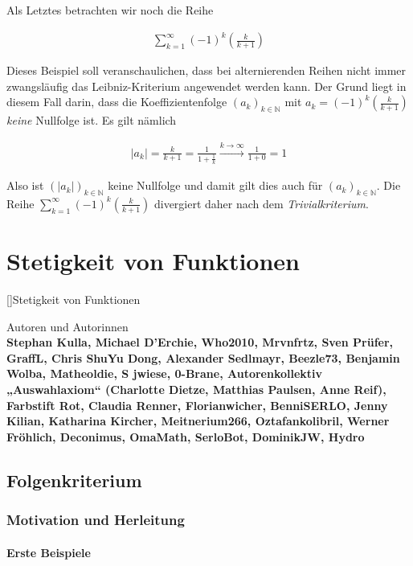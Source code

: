 \documentclass[fontsize=9pt,
               parskip=half-,
               DIV=14,
               listof=chapterentry,
               tocflat]{scrbook}
\newenvironment{authors}{\par\vspace*{\fill}\color{white}Autoren und
Autorinnen\\\bfseries}{\clearpage}
\begin{document}
Als Letztes betrachten wir noch die Reihe

\begin{align*}
\sum _{k=1}^{\infty }(-1)^{k}\left({\frac {k}{k+1}}\right)
\end{align*}

Dieses Beispiel soll veranschaulichen, dass bei alternierenden Reihen nicht immer zwangsläufig das Leibniz-Kriterium angewendet werden kann. Der Grund liegt in diesem Fall darin, dass die Koeffizientenfolge $(a_{k})_{k\in \mathbb {N} }$ mit $a_{k}=(-1)^{k}\left({\tfrac {k}{k+1}}\right)$ \emph{keine} Nullfolge ist. Es gilt nämlich

\begin{align*}
|a_{k}|={\frac {k}{k+1}}={\frac {1}{1+{\frac {1}{k}}}}{\overset {k\to \infty }{\to }}{\frac {1}{1+0}}=1
\end{align*}

Also ist $(|a_{k}|)_{k\in \mathbb {N} }$ keine Nullfolge und damit gilt dies auch für $(a_{k})_{k\in \mathbb {N} }$. Die Reihe $\sum _{k=1}^{\infty }(-1)^{k}\left({\tfrac {k}{k+1}}\right)$ divergiert daher nach dem \emph{Trivialkriterium}.

\part{Stetigkeit von Funktionen}

[]{Stetigkeit von Funktionen}\begin{authors}
Stephan Kulla, Michael D'Erchie, Who2010, Mrvnfrtz, Sven Prüfer, GraffL, Chris ShuYu Dong, Alexander Sedlmayr, Beezle73, Benjamin Wolba, Matheoldie, S jwiese, 0-Brane, Autorenkollektiv „Auswahlaxiom“ (Charlotte Dietze, Matthias Paulsen, Anne Reif), Farbstift Rot, Claudia Renner, Florianwicher, BenniSERLO, Jenny Kilian, Katharina Kircher, Meitnerium266, Oztafankolibril, Werner Fröhlich, Deconimus, OmaMath, SerloBot, DominikJW, Hydro\end{authors}

\chapter{Folgenkriterium}

\section{Motivation und Herleitung}

\subsection{Erste Beispiele}
\end{document}
